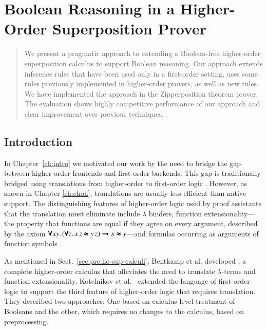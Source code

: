 \chapter{Boolean Reasoning in a Higher-Order Superposition Prover}
\label{ch:bools}




\begin{abstract}
    We present a pragmatic approach to extending a Boolean-free higher-order
    superposition calculus to support Boolean reasoning. Our approach extends
    inference rules that have been used only in a first-order setting, uses some
    rules previously implemented in higher-order provers, as well as new rules.
    We have implemented the approach in the Zipperposition
    theorem prover. The evaluation shows highly competitive performance of our approach
    and clear improvement over previous techniques.
\end{abstract}

\newpage

\section{Introduction} 
\label{sect:bool:introduction}

In Chapter~\ref{ch:intro} we motivated our work by the need to bridge the gap
between higher-order frontends and first-order backends. This gap is
traditionally bridged using translations from higher-order to
first-order logic \cite{ar-70-hol, mp-08-trans}. However, as shown in Chapter
\ref{ch:ehoh}, translations are usually less efficient than native support. The
distinguishing features of higher-order logic used by proof assistants that the
translation must eliminate include $\lambda$ binders, function
extensionality---the property that functions are equal if they agree on every
argument, described by the axiom $\pmb{\forall} xy. \allowbreak\, (\pmb{\forall} z. \, x
\, z \pmb{\approx} y \,z) \pmb{\rightarrow} x \pmb{\approx} y$---and formulas occurring as arguments of
function symbols \cite{mp-08-trans}.


As mentioned in Sect.~\ref{sec:pre:ho-sup-calculi}, Bentkamp et al. developed
\lsup{}, a complete higher-order calculus that alleviates the need to translate
$\lambda$-terms and function extensionality. Kotelnikov et al.\
\cite{kotelnikov-15-fool,kotelnikov-16-fool} extended the language of
first-order logic to support the third feature of higher-order logic that
requires translation. They described two approaches: One based on calculus-level
treatment of Booleans and the other, which requires no changes to the calculus,
based on preprocessing.

